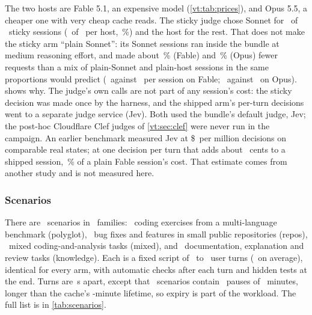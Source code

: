 \begin{table}[tbp]
\centering\small
\caption{Main-loop requests by host, arm, model and reasoning effort (``unset'' is the provider default).}
\label{vt:tab:effortmix}

\end{table}

The two hosts are Fable 5.1, an expensive model (\cref{vt:tab:prices}), and Opus 5.5, a cheaper one with very
cheap cache reads. The sticky judge chose Sonnet for
\NStickySonnetOnly\ of \NStickySessions\ sticky sessions (\StickyCheap\ of \StickyDecisions\ per host,
\StickyCheapPct\,\%) and the host for the rest. That does not make the sticky arm ``plain Sonnet'': its Sonnet
sessions ran inside the bundle at medium reasoning effort, and made about \RvReqGapFable\,\% (Fable) and
\RvReqGapOpus\,\% (Opus) fewer requests than a mix of plain-Sonnet and plain-host sessions in the same proportions
would predict (\RvReqActFable\ against \RvReqPredFable\ per session on Fable; \RvReqActOpus\ against \RvReqPredOpus\ on
Opus).  shows why. The judge's own calls are not part of any session's cost: the sticky decision was made once by the
harness, and the shipped arm's per-turn decisions went to a separate judge service (Jev). Both used the bundle's
default judge, Jev; the post-hoc Cloudflare Clef judges of \cref{vt:sec:clef} were never run in the campaign. An earlier benchmark
measured Jev at \$\JevPerMillion\ per million decisions on comparable real states; at one decision per turn
that adds about \JudgeShippedCents\ cents to a shipped session, \JudgeShippedShare\,\% of a plain Fable
session's cost. That estimate comes from another study and is not measured here.

\subsubsection{Scenarios}

There are \NScenarios\ scenarios in \NFamilies\ families: \FamPolyglot\ coding exercises from a
multi-language benchmark (polyglot), \FamRepos\ bug fixes and features in small public repositories
(repos), \FamMixed\ mixed coding-and-analysis tasks (mixed), and \FamKnowledge\ documentation, explanation
and review tasks (knowledge). Each is a fixed script of \MinTurns\ to \MaxTurns\ user turns (\MeanTurns\ on
average), identical for every arm, with automatic checks after each turn and hidden tests at the end.
Turns are \ShortGapS\,s apart, except that \NLongGapScen\ scenarios contain \LongGapsPerScen\ pauses of
\LongGapMin\ minutes, longer than the cache's \CacheTTLMin-minute lifetime, so expiry is part of the
workload. The full list is in \cref{tab:scenarios}.

